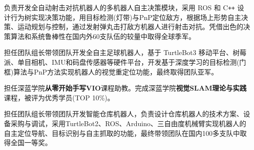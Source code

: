 \documentclass{resume}
\begin{document}
\begin{onehalfspacing}
负责开发全自动射击对抗机器人的多机器人自主决策模块，采用 ROS 和 C\texttt{++} 设计行为树实现决策功能，用目标检测(灯带)与PnP定位敌方，根据场上形势自主决策、运动规划与控制，通过发射弹丸击打敌方机器人进行射击对抗。凭借出色的决策算法和系统鲁棒性在国内外60支队伍的较量中取得全球季军。
\end{onehalfspacing}
\begin{onehalfspacing}
担任团队组长带领团队开发全自主足球机器人，基于 TurtleBot3 移动平台、树莓派、单目相机、IMU和码盘传感器等硬件平台，开发基于深度学习的目标检测(门框)算法与PnP方法实现机器人的视觉重定位功能，最终取得团队亚军。
\end{onehalfspacing}
\begin{onehalfspacing}
担任深蓝学院\textbf{从零开始手写VIO}课程助教。完成深蓝学院\textbf{视觉SLAM理论与实践}课程，被评为优秀学员(TOP 10\%)。
\end{onehalfspacing}
\begin{onehalfspacing}
担任团队组长带领团队开发智能仓库机器人，负责设计仓库机器人的技术方案、设备采购与调试，采用TurtleBot2、ROS、Arduino、三自由度机械臂实现机器人的自主定位导航、目标识别与自主抓取的功能，最终带领团队在国内100多支队中取得全国一等奖。
\end{onehalfspacing}
\end{document}
